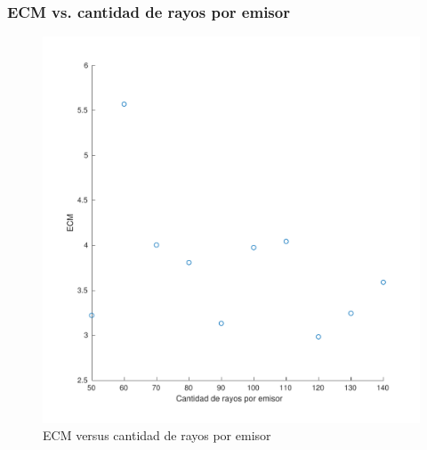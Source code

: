 \documentclass[11pt]{beamer}
\begin{document}
\begin{frame}
    \frametitle{ECM vs. cantidad de rayos por emisor}
    
    \begin{figure}[H]
        \centering
            
                \includegraphics[scale=0.45]{img/cantrayos_ecm-eps-converted-to.pdf}
                \caption{ECM versus cantidad de rayos por emisor}
                \label{fig:ECM versus rayos por emisor}
            
        \end{figure}
\end{frame}
    
\end{document}
